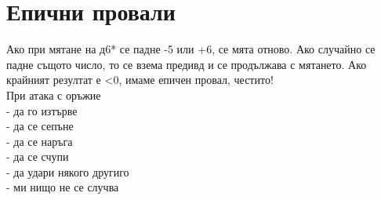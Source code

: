 \section{Епични провали}
Ако при мятане на д6* се падне -5 или +6, се мята отново.
Ако случайно се падне същото число, то се взема предивд и се продължава с мятането.
Ако крайният резултат е <0, имаме епичен провал, честито!  \\

При атака с оръжие           \\
- да го изтърве              \\
- да се сепъне               \\
- да се наръга               \\
- да се счупи                \\
- да удари някого другиго    \\
- ми нищо не се случва       \\
